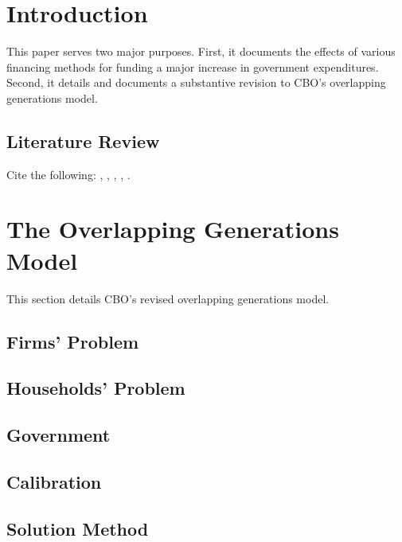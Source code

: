 \documentclass[letterpaper,12pt]{article}
\numberwithin{equation}{section}
\numberwithin{figure}{section}
\numberwithin{table}{section}
\begin{document}
\begin{spacing}{1.5}

\section{Introduction} \label{sec_intro}

	This paper serves two major purposes.  First, it documents the effects of various financing methods for funding a major increase in government expenditures.  Second, it details and documents a substantive revision to CBO's overlapping generations model.

	\subsection{Literature Review} \label{sec_intro_lit}

		Cite the following: \citet{Auerbach.Kotlikoff:1987}, \citet{NishiyamaSmetters:2007}, \citet{Nishiyama.Smetters:2014}, \citet{NishiyamaReichling:2015}, \citet{NelsonEtal:2019}.


\section{The Overlapping Generations Model} \label{sec_OLGModel}

	This section details CBO's revised overlapping generations model.

	\subsection{Firms' Problem} \label{sec_OLGModel_firms}

	\subsection{Households' Problem} \label{sec_OLGModel_HH}

	\subsection{Government} \label{sec_OLGModel_govt}

	\subsection{Calibration} \label{sec_OLGModel_calib}

	\subsection{Solution Method} \label{sec_OLGModel_soln}



\end{spacing}
\end{document}
